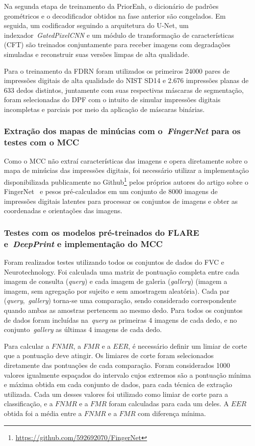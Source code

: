 Na segunda etapa de treinamento da PriorEnh, o dicionário de padrões geométricos e o decodificador obtidos na fase anterior são congelados. Em seguida, um codificador seguindo a arquitetura do U-Net, um indexador~\textit{GatedPixelCNN}\cite{pixel-cnn} e um módulo de transformação de características (CFT)\cite{cft} são treinados conjuntamente para receber imagens com degradações simuladas e reconstruir suas versões limpas de alta qualidade.

Para o treinamento da FDRN foram utilizados os primeiros 24000 pares de impressões digitais de alta qualidade do NIST SD14 e 2.676 impressões planas de 633 dedos distintos, juntamente com suas respectivas máscaras de segmentação, foram selecionadas do DPF com o intuito de simular impressões digitais incompletas e parciais por meio da aplicação de máscaras binárias.


\subsubsection{Extração dos mapas de minúcias com o~\textit{FingerNet} para os testes com o MCC}

Como o MCC não extraí características das imagens e opera diretamente sobre o mapa de minúcias das impressões digitais, foi necessário utilizar a implementação disponibilizada publicamente no Github\footnote{\url{https://github.com/592692070/FingerNet}} pelos próprios autores do artigo sobre o FingerNet~\cite{fingernet} e pesos pré-calculados em um conjunto de 8000 imagens de impressões digitais latentes para processar os conjuntos de imagens e obter as coordenadas e orientações das imagens.


\subsubsection{Testes com os modelos pré-treinados do FLARE e~\textit{DeepPrint} e implementação do MCC}\label{subsubsec:testing}

Foram realizados testes utilizando todos os conjuntos de dados do FVC e Neurotechnology. Foi calculada uma matriz de pontuação completa entre cada imagem de consulta (\textit{query}) e cada imagem de galeria (\textit{gallery}) (imagem a imagem, sem agregação por sujeito e sem amostragem aleatória). Cada par (\textit{query},~\textit{gallery}) torna-se uma comparação, sendo considerado correspondente quando ambas as amostras pertencem ao mesmo dedo. Para todos os conjuntos de dados foram incluídas na~\textit{query} as primeiras 4 imagens de cada dedo, e no conjunto~\textit{gallery} as últimas 4 imagens de cada dedo.

Para calcular a $FNMR$, a $FMR$ e a $EER$, é necessário definir um limiar de corte que a pontuação deve atingir. Os limiares de corte foram selecionados diretamente das pontuações de cada comparação. Foram considerados 1000 valores igualmente espaçados do intervalo cujos extremos são a pontuação mínima e máxima obtida em cada conjunto de dados, para cada técnica de extração utilizada. Cada um desses valores foi utilizado como limiar de corte para a classificação, e a $FNMR$ e a $FMR$ foram calculadas para cada um deles. A $EER$ obtida foi a média entre a $FNMR$ e a $FMR$ com diferença mínima.
